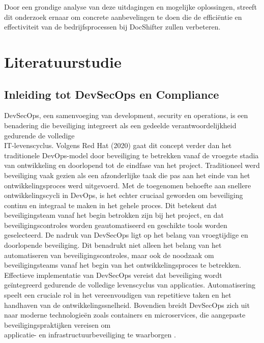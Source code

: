 \documentclass{hogent-article}
\begin{document}
    \noindent Door een grondige analyse van deze uitdagingen en mogelijke oplossingen, streeft dit onderzoek ernaar om concrete aanbevelingen te doen die de efficiëntie en effectiviteit van de bedrijfsprocessen bij DocShifter zullen verbeteren.
    
    
    
    
    
   \section{Literatuurstudie}%
   \label{sec:literatuurstudie}
   \subsection{Inleiding tot DevSecOps en Compliance}
   DevSecOps, een samenvoeging van development, security en operations, is een benadering die beveiliging integreert als een gedeelde verantwoordelijkheid gedurende de volledige \\ IT-levenscyclus. Volgens Red Hat (2020) gaat dit concept verder dan het traditionele DevOps-model door beveiliging te betrekken vanaf de vroegste stadia van ontwikkeling en doorlopend tot de eindfase van het project.
   Traditioneel werd beveiliging vaak gezien als een afzonderlijke taak die pas aan het einde van het ontwikkelingsproces werd uitgevoerd. Met de toegenomen behoefte aan snellere ontwikkelingscycli in DevOps, is het echter cruciaal geworden om beveiliging continu en integraal te maken in het gehele proces. Dit betekent dat beveiligingsteam vanaf het begin betrokken zijn bij het project, en dat beveiligingscontroles worden geautomatiseerd en geschikte tools worden geselecteerd.
   De nadruk van DevSecOps ligt op het belang van vroegtijdige en doorlopende beveiliging. Dit benadrukt niet alleen het belang van het automatiseren van beveiligingscontroles, maar ook de noodzaak om beveiligingsteams vanaf het begin van het ontwikkelingsproces te betrekken.
   Effectieve implementatie van DevSecOps vereist dat beveiliging wordt geïntegreerd gedurende de volledige levenscyclus van applicaties. Automatisering speelt een cruciale rol in het vereenvoudigen van repetitieve taken en het handhaven van de ontwikkelingssnelheid. Bovendien breidt DevSecOps zich uit naar moderne technologieën zoals containers en microservices, die aangepaste beveiligingspraktijken vereisen om \\ applicatie- en infrastructuurbeveiliging te waarborgen \autocite{redhat2023}.
   
\end{document}

